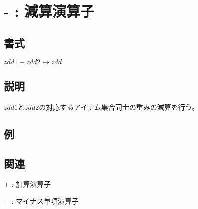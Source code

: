 
\section{- : 減算演算子\label{sect:minus}}
\subsection*{書式}
$zdd1 - zdd2 \rightarrow zdd$

\subsection*{説明}
$zdd1$と$zdd2$の対応するアイテム集合同士の重みの減算を行う。

\subsection*{例}


\subsection*{関連}
\hyperref[sect:plus]{$+$} : 加算演算子

\hyperref[sect:minus_op]{$-$} : マイナス単項演算子
